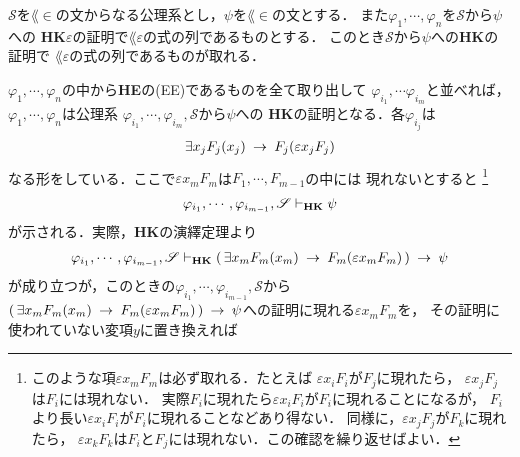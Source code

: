 	\begin{screen}
		\begin{metathm}
		\label{metathm:Henkin_expansion_2}
			$\mathscr{S}$を$\lang{\in}$の文からなる公理系とし，$\psi$を$\lang{\in}$の文とする．
			また$\varphi_{1},\cdots,\varphi_{n}$を$\mathscr{S}$から$\psi$への
			{\bf HK$\varepsilon$}の証明で$\lang{\varepsilon}$の式の列であるものとする．
			このとき$\mathscr{S}$から$\psi$への{\bf HK}の証明で
			$\lang{\varepsilon}$の式の列であるものが取れる．
		\end{metathm}
	\end{screen}
	
	\begin{sketch}
		$\varphi_{1},\cdots,\varphi_{n}$の中から{\bf HE}の(EE)であるものを全て取り出して
		$\varphi_{i_{1}},\cdots\varphi_{i_{m}}$と並べれば，
		$\varphi_{1},\cdots,\varphi_{n}$は公理系
		$\varphi_{i_{1}},\cdots,\varphi_{i_{m}},\mathscr{S}$から$\psi$への
		{\bf HK}の証明となる．各$\varphi_{i_{j}}$は
		\begin{align}
			\exists x_{j} F_{j}(x_{j}) \hspace{0.25em}\rightarrow\hspace{0.25em} F_{j}(\varepsilon x_{j} F_{j})
		\end{align}
		なる形をしている．ここで$\varepsilon x_{m} F_{m}$は$F_{1},\cdots,F_{m-1}$の中には
		現れないとすると
		\footnote{
			このような項$\varepsilon x_{m} F_{m}$は必ず取れる．たとえば
			$\varepsilon x_{i} F_{i}$が$F_{j}$に現れたら，
			$\varepsilon x_{j} F_{j}$は$F_{i}$には現れない．
			実際$F_{i}$に現れたら$\varepsilon x_{i} F_{i}$が$F_{i}$に現れることになるが，
			$F_{i}$より長い$\varepsilon x_{i} F_{i}$が$F_{i}$に現れることなどあり得ない．
			同様に，$\varepsilon x_{j} F_{j}$が$F_{k}$に現れたら，
			$\varepsilon x_{k} F_{k}$は$F_{i}$と$F_{j}$には現れない．この確認を繰り返せばよい．
		}
		\begin{align}
			\varphi_{i_{1}},\cdots,\varphi_{i_{m-1}},\mathscr{S} 
			\vdash_{{\scriptsize \mbox{{\bf HK}}}} \psi
		\end{align}
		が示される．実際，{\bf HK}の演繹定理より
		\begin{align}
			\varphi_{i_{1}},\cdots,\varphi_{i_{m-1}},\mathscr{S} 
			\vdash_{{\scriptsize \mbox{{\bf HK}}}} 
			(\, \exists x_{m} F_{m}(x_{m}) \hspace{0.25em}\rightarrow\hspace{0.25em} F_{m}(\varepsilon x_{m} F_{m})\, ) \hspace{0.25em}\rightarrow\hspace{0.25em} \psi
		\end{align}
		が成り立つが，このときの$\varphi_{i_{1}},\cdots,\varphi_{i_{m-1}},\mathscr{S}$から
		$(\, \exists x_{m} F_{m}(x_{m}) \hspace{0.25em}\rightarrow\hspace{0.25em} F_{m}(\varepsilon x_{m} F_{m})\, ) 
		\hspace{0.25em}\rightarrow\hspace{0.25em} \psi$への証明に現れる$\varepsilon x_{m} F_{m}$を，
		その証明に使われていない変項$y$に置き換えれば

\end{sketch}
